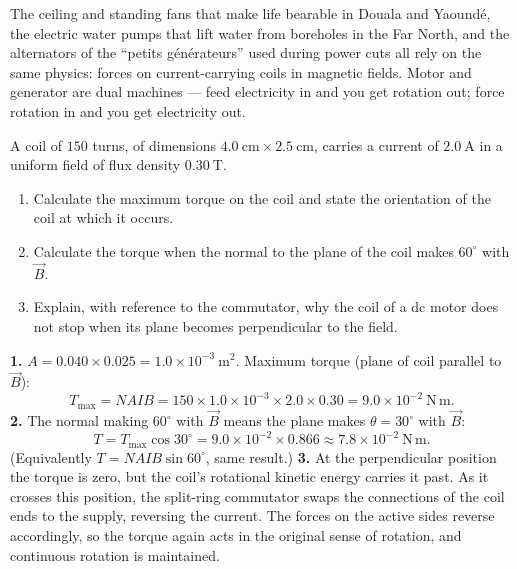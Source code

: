 \documentclass[11pt]{article}
\begin{document}
\begin{savaistu}
The ceiling and standing fans that make life bearable in Douala and Yaound\'e, the electric water pumps that lift water from boreholes in the Far North, and the alternators of the ``petits g\'en\'erateurs'' used during power cuts all rely on the same physics: forces on current-carrying coils in magnetic fields. Motor and generator are dual machines --- feed electricity in and you get rotation out; force rotation in and you get electricity out.
\end{savaistu}

\begin{exercice}
A coil of $150$ turns, of dimensions $4.0\ \mathrm{cm} \times 2.5\ \mathrm{cm}$, carries a current of $2.0\ \mathrm{A}$ in a uniform field of flux density $0.30\ \mathrm{T}$.
\begin{enumerate}
\item Calculate the maximum torque on the coil and state the orientation of the coil at which it occurs.
\item Calculate the torque when the normal to the plane of the coil makes $60^{\circ}$ with $\vec{B}$.
\item Explain, with reference to the commutator, why the coil of a dc motor does not stop when its plane becomes perpendicular to the field.
\end{enumerate}
\end{exercice}

\begin{corrige}[Exercise 1]
\textbf{1.} $A = 0.040 \times 0.025 = 1.0\times10^{-3}\ \mathrm{m^2}$. Maximum torque (plane of coil parallel to $\vec{B}$):
\[ T_{\max} = NAIB = 150 \times 1.0\times10^{-3} \times 2.0 \times 0.30 = 9.0\times10^{-2}\ \mathrm{N\,m}. \]
\textbf{2.} The normal making $60^{\circ}$ with $\vec{B}$ means the plane makes $\theta = 30^{\circ}$ with $\vec{B}$:
\[ T = T_{\max}\cos 30^{\circ} = 9.0\times10^{-2}\times 0.866 \approx 7.8\times10^{-2}\ \mathrm{N\,m}. \]
(Equivalently $T = NAIB\sin 60^{\circ}$, same result.)
\textbf{3.} At the perpendicular position the torque is zero, but the coil's rotational kinetic energy carries it past. As it crosses this position, the split-ring commutator swaps the connections of the coil ends to the supply, reversing the current. The forces on the active sides reverse accordingly, so the torque again acts in the original sense of rotation, and continuous rotation is maintained.
\end{corrige}
\end{document}
